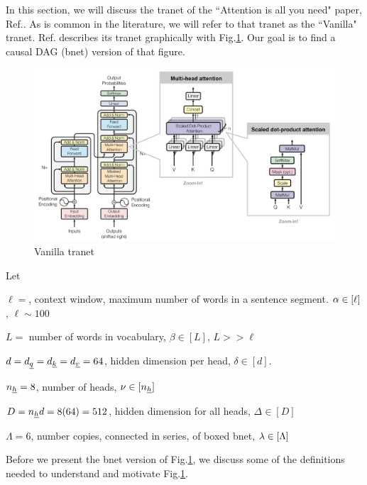 In this section, we
will discuss
 the tranet of
 the ``Attention is all you need" paper, Ref.\cite{attention-is-all-you-need}.
 As is common in the literature,
 we will refer to that tranet as 
 the ``Vanilla" tranet.
 Ref.\cite{attention-is-all-you-need} describes its tranet 
 graphically with Fig.\ref{fig-vanilla-transformer}.
 Our goal
 is to find a causal DAG (bnet)
 version of that figure.

\begin{figure}[!h]
\centering
\includegraphics[width=6in]
{transformer/transformer.png}
\caption{Vanilla tranet}
\label{fig-vanilla-transformer}
\end{figure}

Let

$\ell=$, context window, maximum number of words in a sentence segment. $\alpha\in [\ell]$, $\ell\sim 100$

$L=$ number of words in vocabulary, $\beta\in[L]$, $L>> \ell$

$d=d_{\underline{q}}=d_{\underline{k}}=d_{\underline{v}}=64$, hidden dimension  per head,
$\delta\in[d]$. 

$n_{\underline{h}}=8$, number of heads, $\nu \in[n_{\underline{h}}]$

$D=n_{\underline{h}} d=8(64)=512$, hidden dimension for all heads,
$\Delta\in [D]$

$\Lambda=6$, number copies,
connected in series,
of boxed bnet, $\lambda\in[\Lambda]$



Before we present the bnet
version of Fig.\ref{fig-vanilla-transformer},
we discuss some of the 
definitions needed to
understand and motivate
 Fig.\ref{fig-vanilla-transformer}.
 
